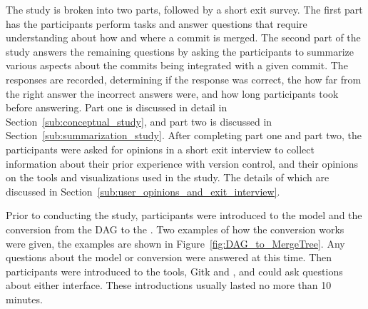The study is broken into two parts, followed by a short exit survey.
The first part has the participants perform tasks and answer questions
that require understanding about how and where a commit is merged.
The second part of the study answers the remaining questions by asking
the participants to summarize various aspects about the commits being
integrated with a given commit.
The responses are recorded, determining if the response was correct,
the how far from the right answer the incorrect answers were,
and how long participants took before answering.
Part one is discussed in detail in Section~\ref{sub:conceptual_study},
and part two is discussed in Section~\ref{sub:summarization_study}.
After completing part one and part two, the participants were asked for
opinions in a short exit interview to collect information about their
prior experience with version control, and their opinions on the tools
and visualizations used in the study. The details of which are discussed
in Section~\ref{sub:user_opinions_and_exit_interview}.

Prior to conducting the study, participants were introduced to the \mt{}
model and the conversion from the DAG to the \mt{}.
Two examples of how the conversion works were given,
the examples are shown in Figure~\ref{fig:DAG_to_MergeTree}.
Any questions about the model or conversion were answered at this time.
Then participants were introduced to the tools, Gitk and \tool{},
and could ask questions about either interface.
These introductions usually lasted no more than 10 minutes.

